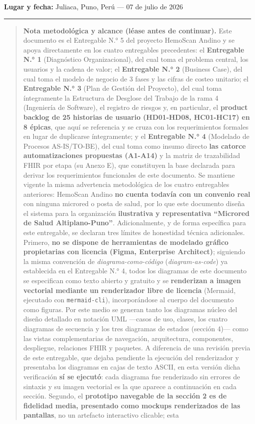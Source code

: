 \documentclass[11pt,a4paper]{article}
\begin{document}
\textbf{Lugar y fecha:} Juliaca, Puno, Perú --- 07 de julio de 2026

\begin{center}\rule{0.5\linewidth}{0.5pt}\end{center}

\begin{quote}
\textbf{Nota metodológica y alcance (léase antes de continuar).} Este documento es el Entregable N.° 5 del proyecto HemoScan Andino y se apoya directamente en los cuatro entregables precedentes: el \textbf{Entregable N.° 1} (Diagnóstico Organizacional), del cual toma el problema central, los usuarios y la cadena de valor; el \textbf{Entregable N.° 2} (Business Case), del cual toma el modelo de negocio de 3 fases y las cifras de costeo unitario; el \textbf{Entregable N.° 3} (Plan de Gestión del Proyecto), del cual toma íntegramente la Estructura de Desglose del Trabajo de la rama 4 (Ingeniería de Software), el registro de riesgos y, en particular, el \textbf{product backlog de 25 historias de usuario (HD01-HD08, HC01-HC17) en 8 épicas}, que aquí se referencia y se cruza con los requerimientos formales en lugar de duplicarse íntegramente; y el \textbf{Entregable N.° 4} (Modelado de Procesos AS-IS/TO-BE), del cual toma como insumo directo \textbf{las catorce automatizaciones propuestas (A1-A14)} y la matriz de trazabilidad FHIR por etapa (su Anexo E), que constituyen la base declarada para derivar los requerimientos funcionales de este documento. Se mantiene vigente la misma advertencia metodológica de los cuatro entregables anteriores: HemoScan Andino \textbf{no cuenta todavía con un convenio real} con ninguna microred o posta de salud, por lo que este documento diseña el sistema para la organización \textbf{ilustrativa y representativa ``Microred de Salud Altiplano-Puno''}. Adicionalmente, y de forma específica para este entregable, se declaran tres límites de honestidad técnica adicionales. Primero, \textbf{no se dispone de herramientas de modelado gráfico propietarias con licencia (Figma, Enterprise Architect)}; siguiendo la misma convención de \emph{diagrama-como-código} (\emph{diagram-as-code}) ya establecida en el Entregable N.° 4, todos los diagramas de este documento se especifican como texto abierto y gratuito y se \textbf{renderizan a imagen vectorial mediante un renderizador libre de licencia} (Mermaid, ejecutado con \texttt{mermaid-cli}), incorporándose al cuerpo del documento como figuras. Por este medio se generan tanto los diagramas núcleo del diseño detallado en notación UML ---casos de uso, clases, los cuatro diagramas de secuencia y los tres diagramas de estados (sección 4)--- como las vistas complementarias de navegación, arquitectura, componentes, despliegue, relaciones FHIR y paquetes. A diferencia de una revisión previa de este entregable, que dejaba pendiente la ejecución del renderizador y presentaba los diagramas en cajas de texto ASCII, en esta versión dicha verificación \textbf{sí se ejecutó}: cada diagrama fue renderizado sin errores de sintaxis y su imagen vectorial es la que aparece a continuación en cada sección. Segundo, el \textbf{prototipo navegable de la sección 2 es de fidelidad media, presentado como mockups renderizados de las pantallas}, no un artefacto interactivo clicable; esta 
\end{quote}
\end{document}
